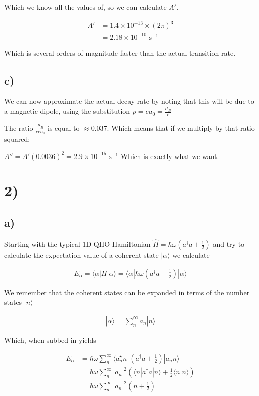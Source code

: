 \documentclass{article}
\newcommand{\p}[1]{\left(#1\right)}
\newcommand{\braket}[1]{\langle#1\rangle}
\newcommand{\bra}[1]{|#1\rangle}
\begin{document}
Which we know all the values of, so we can calculate $A'$.

\begin{align*}
    A'&=1.4\times10^{-13}\times(2\pi)^3\\[1em]
    &=2.18\times10^{-10}\text{ s}^{-1}
\end{align*}

Which is several orders of magnitude faster than the actual transition rate.

\subsection*{c)}
We can now approximate the actual decay rate by noting that this will be due to a magnetic dipole, using the substitution $p=ea_0=\frac{\mu_B}{c}$

The ratio $\frac{\mu_B}{cea_0}$ is equal to $\approx0.037$. Which means that if we multiply by that ratio squared;

$A''=A'(0.0036)^2=2.9\times10^{-15}\text{ s}^{-1}$
Which is exactly what we want.

\section*{2)}
\subsection*{a)}

Starting with the typical 1D QHO Hamiltonian $\hat{H}=\hbar\omega\p{a^\dagger{a}+\frac{1}{2}}$ and try to calculate the expectation value of a coherent state $\bra{\alpha}$ we calculate 

\begin{align*}
    E_\alpha=\braket{\alpha|H|\alpha}=\braket{\alpha|\hbar\omega\p{a^\dagger{a}+\frac{1}{2}}|\alpha}
\end{align*}

We remember that the coherent states can be expanded in terms of the number states $\bra{n}$

\begin{align*}
    \bra{\alpha}=\sum_{n}^{\infty}a_n\bra{n}
\end{align*}

Which, when subbed in yields

\begin{align*}
    E_\alpha&=\hbar\omega\sum_{n}^{\infty}\braket{a_n^\star{n}|\p{a^\dagger{a}+\frac{1}{2}}|a_nn}\\[1em]
    &=\hbar\omega\sum_{n}^{\infty}|a_n|^2\p{\braket{n|a^\dagger{a}|n}+\frac{1}{2}\braket{n|n}}\\[1em]
    &=\hbar\omega\sum_{n}^{\infty}|a_n|^2\p{n+\frac{1}{2}}
\end{align*}
\end{document}

